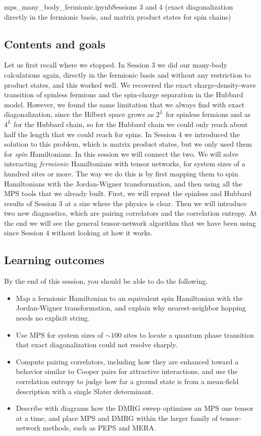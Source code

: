 \documentclass[lecture_notes.tex]{subfiles}
\begin{document}
%
  {mps\_many\_body\_fermionic.ipynb}{Sessions 3 and 4 (exact diagonalization directly in the fermionic
  basis, and matrix product states for spin chains)}

\subsection*{Contents and goals}
Let us first recall where we stopped. In Session 3 we did our many-body calculations again,
directly in the fermionic basis and without any restriction to product states, and this worked
well. We recovered the exact charge-density-wave transition of spinless fermions and the
spin-charge separation in the Hubbard model. However, we found the same limitation that we always
find with exact diagonalization, since the Hilbert space grows as $2^L$ for spinless fermions and
as $4^L$ for the Hubbard chain, so for the Hubbard chain we could only reach about half the length
that we could reach for spins. In Session 4 we introduced the solution to this problem, which is
matrix product states, but we only used them for \emph{spin} Hamiltonians. In this session we will
connect the two. We will solve interacting \emph{fermionic} Hamiltonians with tensor networks, for
system sizes of a hundred sites or more. The way we do this is by first mapping them to spin
Hamiltonians with the Jordan-Wigner transformation, and then using all the MPS tools that we
already built. First, we will repeat the spinless and Hubbard results of Session 3 at a size where
the physics is clear. Then we will introduce two new diagnostics, which are pairing correlators and
the correlation entropy. At the end we will see the general tensor-network algorithm that we have
been using since Session 4 without looking at how it works.

\subsection*{Learning outcomes}
By the end of this session, you should be able to do the following.
\begin{itemize}[nosep]
  \item Map a fermionic Hamiltonian to an equivalent spin Hamiltonian with the Jordan-Wigner
    transformation, and explain why nearest-neighbor hopping needs no explicit string.
  \item Use MPS for system sizes of $\sim100$ sites to locate a quantum phase transition
    that exact diagonalization could not resolve sharply.
  \item Compute pairing correlators, including how they are enhanced toward a behavior similar to
    Cooper pairs for attractive interactions, and use the correlation entropy to judge how far a
    ground state is from a mean-field description with a single Slater determinant.
  \item Describe with diagrams how the DMRG sweep optimizes an MPS one tensor at a time, and place
    MPS and DMRG within the larger family of tensor-network methods, such as PEPS and MERA.
\end{itemize}
\end{document}
